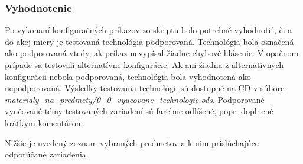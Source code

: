\subsubsection{Vyhodnotenie}

Po vykonaní konfiguračných príkazov zo skriptu bolo potrebné vyhodnotiť, či a do akej miery je testovaná technológia podporovaná. Technológia bola označená ako podporovaná vtedy, ak príkaz nevypísal žiadne chybové hlásenie. V opačnom prípade sa testovali alternatívne konfigurácie. Ak ani žiadna z alternatívnych konfigurácii nebola podporovaná, technológia bola vyhodnotená ako nepodporovaná. Výsledky testovania technológii sú dostupné na CD v súbore \\
\emph{materialy\_na\_predmety/0\_0\_vyucovane\_technologie.ods}. Podporované vyučované témy testovaných zariadení sú farebne odlíšené, popr. doplnené krátkym komentárom.

Nižšie je uvedený zoznam vybraných predmetov a k nim prislúchajúce odporúčané zariadenia.

